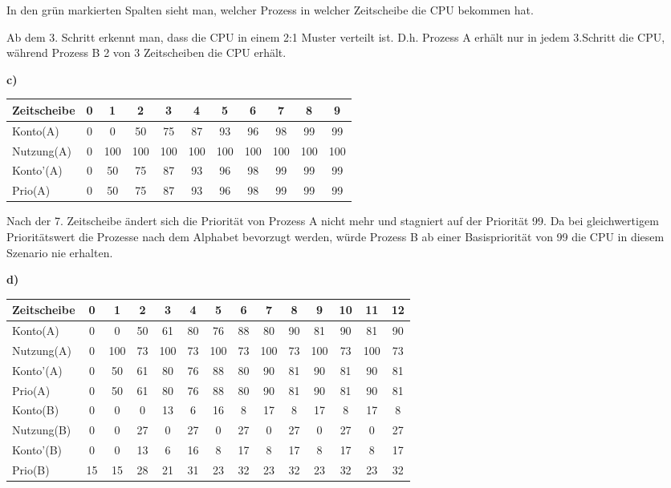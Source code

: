 \documentclass{ti2}
\begin{document}
In den grün markierten Spalten sieht man, welcher Prozess in welcher Zeitscheibe die CPU bekommen hat. 

Ab dem 3. Schritt erkennt man, dass die CPU in einem 2:1 Muster verteilt ist. D.h. Prozess A erhält nur in jedem 3.Schritt die CPU, während Prozess B 2 von 3 Zeitscheiben die CPU erhält. 

\textbf{c)}

\begin{tabular}{|p{}|| c | c | c | c | c | c | c | c | c | c |}
\hline
Zeitscheibe &  0 & 1 & 2 & 3 & 4 & 5 & 6 & 7 & 8 & 9   \\
\hline
\hline
Konto(A)  &  0 & 0 & 50 & 75 & 87 & 93 & 96 & 98 & 99 & 99  \\
\hline
Nutzung(A)  &  0 & 100 & 100 & 100 & 100 & 100 & 100 & 100 & 100 & 100  \\
\hline
Konto'(A)  &  0 & 50 & 75 & 87 & 93 & 96 & 98 & 99 & 99 & 99  \\
\hline
Prio(A)  &  0 & 50 & 75 & 87 & 93 &96 & 98 & 99 & 99 & 99  \\
\hline
\end{tabular}

Nach der 7. Zeitscheibe ändert sich die Priorität von Prozess A nicht mehr und stagniert auf der Priorität 99. Da bei gleichwertigem Prioritätswert die Prozesse nach dem Alphabet bevorzugt werden, würde Prozess B ab einer Basispriorität von 99 die CPU in diesem Szenario nie erhalten.


\textbf{d)}

\begin{tabular}{|p{}|| c | c | c | c | c | c | c | c | c | c | c | c | c |}
\hline
Zeitscheibe &  0 & 1 & 2 & 3 & 4 & 5 & 6 & 7 & 8 & 9 & 10 & 11 & 12   \\
\hline
\hline
Konto(A)  &  0 & 0 & 50 & 61 & 80 & 76 & 88 & 80 & 90 & 81 & 90 & 81 & 90  \\
\hline
Nutzung(A)  &  0 & 100 & 73 & 100 & 73 & 100 & 73 & 100 & 73 & 100 & 73 & 100 & 73  \\
\hline
Konto'(A)  &  0 & 50 & 61 & 80 & 76 & 88 & 80 & 90 & 81 & 90 & 81 & 90 & 81  \\
\hline
Prio(A)  &  0 & 50 & 61 & 80 & 76 & 88 & 80 & 90 & 81 & 90 & 81 & 90 & 81  \\
\hline
\hline
Konto(B)  &  0 & 0 & 0 & 13 & 6 & 16 & 8 & 17 & 8 & 17 & 8 & 17 & 8  \\
\hline
Nutzung(B)  &  0 & 0 & 27 & \cellcolor{red}0 & 27 & \cellcolor{red}0 & 27 & \cellcolor{red}0 & 27 & \cellcolor{red}0 & 27 & \cellcolor{red}0 & 27  \\
\hline
Konto'(B)  &  0 & 0 & 13 & 6 & 16 & 8 & 17 & 8 & 17 & 8 & 17 & 8 & 17  \\
\hline
Prio(B)  &  15 & 15 & 28 & 21 & 31 & 23 & 32 & 23 & 32 & 23 & 32 & 23 & 32  \\
\hline
\end{tabular}
\end{document}
